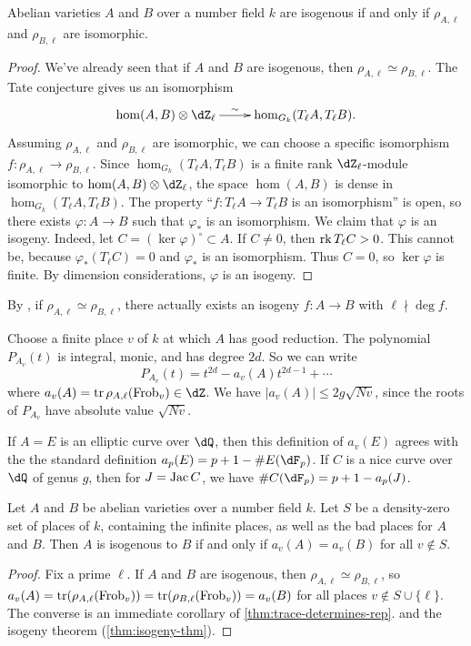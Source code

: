 \begin{corollary}\label{thm:isogeny-thm}
Abelian varieties $A$ and $B$ over a number field $k$ are isogenous if and only 
if $\rho_{A,\ell}$ and $\rho_{B,\ell}$ are isomorphic. 
\end{corollary}
\begin{proof}
We've already seen that if $A$ and $B$ are isogenous, then 
$\rho_{A,\ell}\simeq \rho_{B,\ell}$. The Tate conjecture gives us an 
isomorphism 
\[\xymatrix{
  \hom(A,B)\otimes\dZ_\ell \ar[r]^-\sim 
    & \hom_{G_k}(T_\ell A,T_\ell B) \text{.}
}\]
Assuming $\rho_{A,\ell}$ and $\rho_{B,\ell}$ are isomorphic, we can choose 
a specific isomorphism $f:\rho_{A,\ell}\to \rho_{B,\ell}$. Since 
$\hom_{G_k}(T_\ell A,T_\ell B)$ is a finite rank $\dZ_\ell$-module isomorphic 
to $\hom(A,B)\otimes \dZ_\ell$, the space $\hom(A,B)$ is dense in 
$\hom_{G_k}(T_\ell A,T_\ell B)$. The property ``$f:T_\ell A\to T_\ell B$ is an 
isomorphism'' is open, so there exists $\varphi:A\to B$ such that 
$\varphi_\ast$ is an isomorphism. We claim that $\varphi$ is an isogeny. 
Indeed, let $C=(\ker\varphi)^\circ\subset A$. If $C\ne 0$, then 
$\operatorname{rk} T_\ell C > 0$. This cannot be, because $\varphi_\ast(T_\ell C) = 0$ and 
$\varphi_\ast$ is an isomorphism. Thus $C=0$, so $\ker \varphi$ is finite. By 
dimension considerations, $\varphi$ is an isogeny. 
\end{proof}
By \cite[V.3.2]{fa84}, if $\rho_{A,\ell}\simeq \rho_{B,\ell}$, there actually 
exists an isogeny $f:A\to B$ with $\ell\nmid \deg f$. 

Choose a finite place $v$ of $k$ at which $A$ has good reduction. The 
polynomial $P_{A_v}(t)$ is integral, monic, and has degree $2 d$. So we can 
write 
\[
  P_{A_v}(t) = t^{2 d} - a_v(A) t^{2 d-1} + \cdots 
\]
where $a_v(A)=\trace\rho_{A,\ell}(\frob_v)\in \dZ$. We have 
$|a_v(A)|\leqslant 2 g \sqrt{N v}$, since the roots of $P_{A_v}$ have 
absolute value $\sqrt{N v}$. 

If $A=E$ is an elliptic curve over $\dQ$, then this definition of $a_v(E)$ 
agrees with the the standard definition $a_p(E)=p+1-\# E(\dF_p)$. If 
$C$ is a nice curve over $\dQ$ of genus $g$, then for 
$J=\operatorname{Jac} C$, we have $\# C(\dF_p) = p+1-a_p(J)$. 

\begin{theorem}
Let $A$ and $B$ be abelian varieties over a number field $k$. Let $S$ be a 
density-zero set of places of $k$, containing the infinite places, as well as 
the bad places for $A$ and $B$. Then $A$ is isogenous to $B$ if and only if 
$a_v(A)=a_v(B)$ for all $v\notin S$. 
\end{theorem}
\begin{proof}
Fix a prime $\ell$. If $A$ and $B$ are isogenous, then 
$\rho_{A,\ell}\simeq \rho_{B,\ell}$, so 
$a_v(A)=\operatorname{tr}(\rho_{A,\ell}(\mathrm{Frob}_v))=\operatorname{tr}(\rho_{B,\ell}(\mathrm{Frob}_v))=a_v(B)$ 
for all places $v\notin S\cup\{\ell\}$. The converse is an immediate corollary 
of \ref{thm:trace-determines-rep}. and the isogeny theorem 
(\ref{thm:isogeny-thm}). 
\end{proof}

